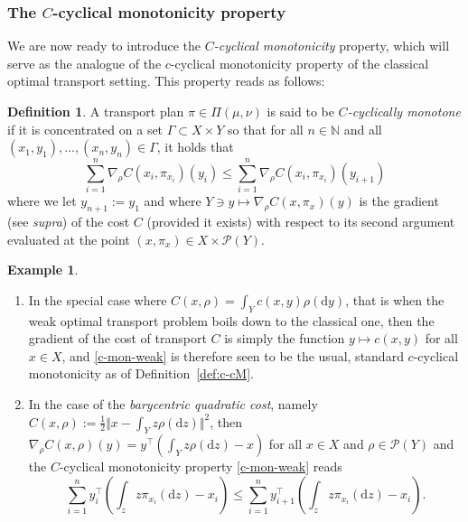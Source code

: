 \documentclass[leqno, 11pt, a4paper]{amsart}
\theoremstyle{definition}
\newtheorem{defi}{Definition}
\newtheorem{ex}{Example}
\newcommand{\N}{\mathbb{N}}
\newcommand{\cP}{\mathcal{P}}
\newcommand{\dd}{\mathrm{d}}
\begin{document}
\subsubsection{The $C$-cyclical monotonicity property}
We are now ready to introduce the \textit{$C$-cyclical monotonicity} property, which will serve as the analogue  of the $c$-cyclical monotonicity property of the classical optimal transport setting. This property reads as follows:
\begin{defi}\label{def:C-cm}
	A transport plan $\pi \in \Pi(\mu, \nu)$ is said to be \textit{$C$-cyclically monotone} if it is concentrated on a set $\Gamma \subset X \times Y$ so that for all $n \in \N$ and all $(x_1, y_1), \dots, (x_n, y_n) \in \Gamma$, it holds that
	\begin{equation}\label{c-mon-weak}
		\sum_{i = 1}^n \nabla_\rho C(x_i, \pi_{x_i})(y_i) \leq \sum_{i = 1}^n \nabla_\rho C(x_i, \pi_{x_i})(y_{i+1})
	\end{equation}
	where we let $y_{n+1} := y_1$ and where $Y \ni y \mapsto \nabla_\rho C(x, \pi_x)(y)$ is the gradient (see \textit{supra}) of the cost $C$ (provided it exists) with respect to its second argument evaluated at the point $(x, \pi_x) \in X \times \cP(Y)$. 
\end{defi}


\begin{ex}
	\begin{enumerate}
		\item In the special case where $C(x, \rho) = \int_{Y} c(x, y) \rho(\dd y)$, that is when the weak optimal transport problem boils down to the classical one, then the gradient of the cost of transport $C$ is simply the function $y \mapsto c(x, y)$ for all $x \in X$, and \eqref{c-mon-weak} is therefore seen to be the usual, standard $c$-cyclical monotonicity as of Definition~\ref{def:c-cM}.
		\item In the case of the \textit{barycentric quadratic cost}, namely $C(x, \rho) := \frac12 \Vert x - \int_{Y} z \rho(\dd z)\Vert^2$, then  $\nabla_\rho C(x, \rho)(y) = y^\intercal\left(\int_Y z \rho(\dd z) - x\right)$ for all $x \in X$ and $\rho \in \cP(Y)$ and the $C$-cyclical monotonicity property \eqref{c-mon-weak} reads
		\begin{equation*}
			\sum_{i = 1}^n y_i^\intercal\left(\int_z z \pi_{x_i}(\dd z) - x_i\right) \leq \sum_{i = 1}^n y_{i+1}^\intercal\left(\int_z z \pi_{x_i}(\dd z) - x_i\right).
		\end{equation*}
	\end{enumerate}

\end{ex}
\end{document}
